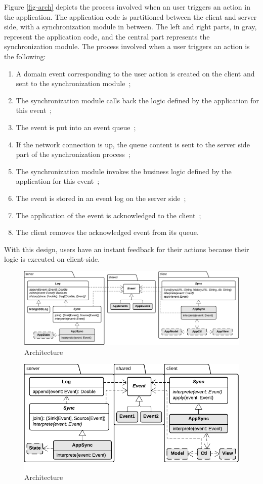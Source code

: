 \documentclass{llncs}
\begin{document}
Figure \ref{fig-arch} depicts the process involved when an user triggers an action in the application. The application code is partitioned between the client and server side, with a synchronization module in between. The left and right parts, in gray, represent the application code, and the central part represents the synchronization module. The process involved when a user triggers an action is the following:

\begin{enumerate}
 \item A domain event corresponding to the user action is created on the client and sent to the synchronization module~;
 \item The synchronization module calls back the logic defined by the application for this event~;
 \item The event is put into an event queue~;
 \item If the network connection is up, the queue content is sent to the server side part of the synchronization process~;
 \item The synchronization module invokes the business logic defined by the application for this event~;
 \item The event is stored in an event log on the server side~;
 \item The application of the event is acknowledged to the client~;
 \item The client removes the acknowledged event from its queue.
\end{enumerate}

With this design, users have an instant feedback for their actions because their logic is executed on client-side.

\begin{figure}
\centering
\includegraphics[width=18cm,angle=90]{classes.pdf}
\caption{Architecture}
\label{fig-classes}
\end{figure}

\begin{figure}
\centering
\includegraphics[width=12cm]{classes2.pdf}
\caption{Architecture}
\label{fig-classes-2}
\end{figure}
\end{document}
